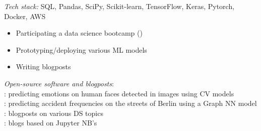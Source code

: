 \documentclass[
	a4paper,
]{fortysecondscv}
\begin{document}
\begin{cvtable}[1.0]
	{}
    {
    \textit{Tech stack:} SQL, Pandas, SciPy, Scikit-learn, TensorFlow, Keras, Pytorch, Docker, AWS
    \begin{changemargin}{-45pt}{0pt}
    \begin{itemize}[topsep=0pt,itemsep=0pt,partopsep=0pt, parsep=0pt, leftmargin=*]
     \setlength\itemsep{1mm}
     \item Participating a data science bootcamp ({\href{https://datascienceretreat.com}{\color{pblue}{DSR, Germany}}})
     \item Prototyping/deploying various ML models
     \item Writing blogposts
    \end{itemize}
    \textit{Open-source software and blogposts}:\\
    \href{https://huggingface.co/spaces/OnurKerimoglu/facemoods}{\color{pblue}{FaceMoods}}: predicting emotions on human faces detected in images using CV models \\ %
    \href{https://onurkerimoglu.pythonanywhere.com}{\color{pblue}{AccIndex}}: predicting accident frequencies on the streets of Berlin using a Graph NN model\\ %
    \href{https://medium.com/@kerimoglu.o}{\color{pblue}{Medium Profile}}: blogposts on various DS topics\\
    \href{https://onurkerimoglu.github.io/}{\color{pblue}{GitHub.io Pages}}: \href{https://quarto.org/}{\color{pblue}{quarto}} blogs based on Jupyter NB's
    \end{changemargin}
    }
    
\end{cvtable}


\newpage


\end{document}
